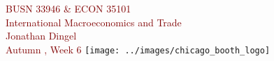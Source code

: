 \documentclass[10pt,notes=hide]{beamer}
\begin{document}
\begin{frame}[plain]
\begin{center}
\large
\textcolor{maroon}{BUSN 33946 \& ECON 35101\\
International Macroeconomics and Trade\\ 
Jonathan Dingel\\
Autumn \the\year, Week 6}
\vfill 
\texttt{[image: ../images/chicago\_booth\_logo]}
\end{center}
\end{frame}
\begin{comment}
\begin{frame}{Before we get started}
\begin{itemize}
	\item Today we're talking about trade with increasing returns, but let's talk about the DFS '77 assignment briefly.
\item Recall our friends
$A(z) \equiv \frac{a^*(z)}{a(z)}$
and
$B\left(\tilde{z}\right) \equiv \frac{\theta \left(\tilde{z}\right) }{1-\theta \left(\tilde{z}%
\right) }\frac{L^{*}}{L}$
\item Equilibrium relative wage $\omega \equiv \frac{w}{w^*}$ is where $A\left(\tilde{z}\right)=B\left(\tilde{z}\right)$
\item Can you vary the $A()$ function such that equilibria exhibit the same volume of trade and different gains from trade?
\end{itemize}
\begin{align*}
	\ln (U/L) 
	&=
	{\ln w} - \int_{0}^{1} b(z) \ln p(z) dz
	\\
	\int_{0}^{1} b(z) \ln a(z) dz 
	&\geq \int_{0}^{\tilde{z}} b(z) \ln a(z) dz + \int_{\tilde{z}}^{1} b(z) \ln \left[w^{*} a^{*}(z)\right] dz 
	\\
	0
	&\geq
	\int_{\tilde{z}}^{1} b(z) \ln \left[A(z) / \omega\right] dz
\end{align*}
What can be said about the magnitude of the gains from trade in this model if we observe the equilibrium volume of trade and do not observe autarky prices?
\end{frame}
\end{comment}
\end{document}
